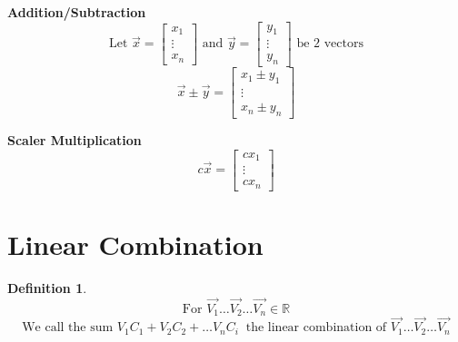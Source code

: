 \documentclass[twoside]{article}
\newtheorem{definition}[theorem]{Definition}
\begin{document}
\newpage 

\textbf{Addition/Subtraction}
\[\text{Let  } \vec{x}=\begin{bmatrix} x_1 \\ \vdots \\ x_n \end{bmatrix} \text{  and  }\vec{y}=\begin{bmatrix} y_1 \\ \vdots \\ y_n \end{bmatrix} \text{   be 2 vectors}\]
\[\vec{x}\pm\vec{y} = \begin{bmatrix} x_1 \pm y_1 \\ \vdots \\ x_n \pm y_n \end{bmatrix} \]


\textbf{Scaler Multiplication}
\[c\vec{x} = \begin{bmatrix} cx_1 \\ \vdots \\ cx_n \end{bmatrix}\]

\section{Linear Combination}
\begin{definition}
\[\text{For  } \vec{V_1} \ldots \vec{V_2} \ldots \vec{V_n} \in \mathbb{R}\]
\[\text{We call the sum   } V_1C_1 + V_2C_2 + \ldots V_nC_i \
\text{   the linear combination of   } \vec{V_1} \ldots \vec{V_2} \ldots \vec{V_n}  \]
\end{definition}
\end{document}
